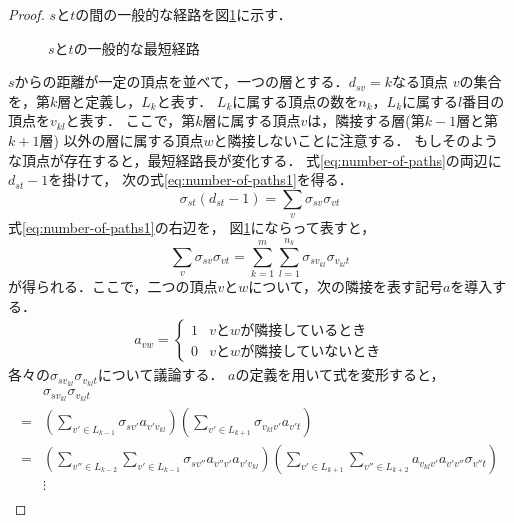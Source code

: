 \begin{proof}
  $s$と$t$の間の一般的な経路を図\ref{fig:proof-number-of-paths}に示す．
  \begin{figure}
    \centering
    \def\svgwidth{.5\columnwidth}
    
    \caption{$s$と$t$の一般的な最短経路}
    \label{fig:proof-number-of-paths}
  \end{figure}
  $s$からの距離が一定の頂点を並べて，一つの層とする．$d_{sv}=k$なる頂点
  $v$の集合を，第$k$層と定義し，$L_k$と表す．
  $L_k$に属する頂点の数を$n_k$，$L_k$に属する$l$番目の頂点を$v_{kl}$と表す．
  ここで，第$k$層に属する頂点$v$は，隣接する層(第$k-1$層と第$k+1$層)
  以外の層に属する頂点$w$と隣接しないことに注意する．
  もしそのような頂点が存在すると，最短経路長が変化する．
  式\ref{eq:number-of-paths}の両辺に$d_{st}-1$を掛けて，
  次の式\ref{eq:number-of-paths1}を得る．
  \begin{equation}
    \sigma_{st}(d_{st}-1)=\sum_{v}\sigma_{sv}\sigma_{vt}
    \label{eq:number-of-paths1}
  \end{equation}
  式\ref{eq:number-of-paths1}の右辺を，
  図\ref{fig:proof-number-of-paths}にならって表すと，
  \begin{equation}
    \sum_{v}\sigma_{sv}\sigma_{vt}=
    \sum_{k=1}^m\sum_{l=1}^{n_k}\sigma_{sv_{kl}}\sigma_{v_{kl}t}
    \label{eq:number-of-paths2}
  \end{equation}
  が得られる．ここで，二つの頂点$v$と$w$について，次の隣接を表す記号$a$を導入する．
  \begin{align*}
    a_{vw}=
    \begin{cases}
      1 & vとwが隣接しているとき \\
      0 & vとwが隣接していないとき
    \end{cases}
  \end{align*}
  各々の$\sigma_{sv_{kl}}\sigma_{v_{kl}t}$について議論する．
  $a$の定義を用いて式を変形すると，
  \begin{align}
    &\sigma_{sv_{kl}}\sigma_{v_{kl}t}\nonumber\\
    =&\left(\sum_{v'\in L_{k-1}}\sigma_{sv'}a_{v'v_{kl}}\right)
    \left(\sum_{v'\in L_{k+1}}\sigma_{v_{kl}v'}a_{v't}\right)
    \nonumber\\
    =&\left(\sum_{v''\in L_{k-2}}\sum_{v'\in L_{k-1}}
    \sigma_{sv''}a_{v''v'}a_{v'v_{kl}}\right)
    \left(\sum_{v'\in L_{k+1}}\sum_{v''\in L_{k+2}}
    a_{v_{kl}v'}a_{v'v''}\sigma_{v''t}\right)
    \nonumber\\
    &\vdots\nonumber\\

\end{align}
\end{proof}
